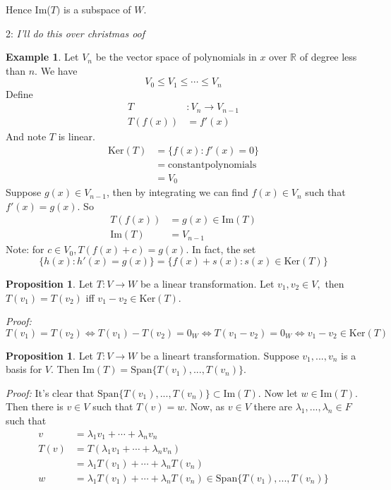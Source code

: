 \documentclass{report}
\theoremstyle{remark}
\theoremstyle{definition}
\theoremstyle{definition}
\newtheorem{example}[theorem]{Example}
\theoremstyle{theorem}
\newtheorem{proposition}[theorem]{Proposition}
\begin{document}
Hence Im($T)$ is a subspace of $W$. \par
2: \emph{I'll do this over christmas oof}
\begin{example}
Let $V_n$ be the vector space of polynomials in $x$ over $\mathbb{R}$ of degree less than $n$. We have
\[V_0 \leq V_1 \leq \cdots \leq V_n\]
Define
\begin{align*}
    T&: V_n \rightarrow V_{n-1}\\
    T(f(x)) &= f'(x)
\end{align*}
And note $T$ is linear.
\begin{align*}
    \mathrm{Ker}(T)&= \{f(x):f'(x)=0\}\\
    &= \mathrm{constant polynomials}\\
    &=V_0
\end{align*}
Suppose $g(x) \in V_{n-1}$, then by integrating we can find $f(x) \in V_n$ such that $f'(x)=g(x)$. So
\begin{align*}
    T(f(x))&=g(x) \in \mathrm{Im}(T)\\
    \mathrm{Im}(T) &= V_{n-1}
\end{align*}
Note: for $c \in V_0, T(f(x)+c) = g(x)$. In fact, the set
\[\{h(x):h'(x)=g(x)\} = \{f(x) + s(x): s(x) \in \mathrm{Ker}(T)\}\]
\end{example}
\begin{proposition}
Let $T:V\rightarrow W$ be a linear transformation. Let $v_1, v_2 \in V,$ then $T(v_1) = T(v_2)$ iff $v_1-v_2 \in \mathrm{Ker}(T)$.
\end{proposition}
\emph{Proof:} $T(v_1)=T(v_2) \iff T(v_1)-T(v_2) = 0_W \iff T(v_1-v_2)=0_W \iff v_1-v_2 \in \mathrm{Ker}(T)$
\begin{proposition}
Let $T:V\rightarrow W$ be a lineart transformation. Suppose $v_1,...,v_n$ is a basis for $V$. Then $\mathrm{Im}(T) = \mathrm{Span}\{T(v_1),...,T(v_n)\}$.
\end{proposition}
\emph{Proof:} It's clear that $\mathrm{Span}\{T(v_1),...,T(v_n)\} \subset \mathrm{Im}(T)$. Now let $w \in \mathrm{Im}(T).$ Then there is $v \in V$ such that $T(v)=w$. Now, as $v \in V$ there are $\lambda_1,...,\lambda_n \in F$ such that
\begin{align*}
    v &= \lambda_1v_1 + \cdots + \lambda_nv_n\\
    T(v)&= T(\lambda_1v_1+\cdots+\lambda_nv_n)\\
    &= \lambda_1T(v_1) + \cdots + \lambda_nT(v_n)\\
    w&=\lambda_1T(v_1) + \cdots + \lambda_nT(v_n) \in \mathrm{Span}\{T(v_1),...,T(v_n)\}
\end{align*}
\end{document}
